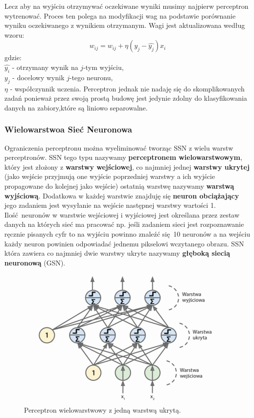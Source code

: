 \documentclass{article}
\begin{document}
Lecz aby na wyjściu otrzymywać oczekiwane wyniki musimy najpierw perceptron wytrenować. Proces
ten polega na modyfikacji wag na podstawie porównanie wyniku oczekiwanego z wynikiem otrzymanym.
Wagi jest aktualizowana według wzoru:
\begin{equation}
	w_{ij} = w_{ij} + \eta(y_j - \hat{y_j})x_i
\end{equation}
gdzie:\\
$\hat{y_i}$ - otrzymany wynik na $j$-tym wyjściu,\\
$y_j$ - docelowy wynik $j$-tego neuronu,\\
$\eta$ - współczynnik uczenia.
Perceptron jednak nie nadaję się do skomplikowanych zadań ponieważ przez swoją prostą budowę
jest jedynie zdolny do klasyfikowania danych na zabiory,które są liniowo separowalne.

\subsubsection{Wielowarstwoa Sieć Neuronowa}
Ograniczenia perceptronu można wyeliminować tworząc SSN z wielu warstw perceptronów.
SSN tego typu nazywamy \textbf{perceptronem wielowarstwowym}, który jest złożony z 
\textbf{warstwy wejściowej}, co najmniej jednej \textbf{warstwy ukrytej} (jako wejście przyjmują
one wyjście poprzedniej warstwy a ich wyjście propagowane do kolejnej jako wejście) ostatnią
warstwę nazywamy \textbf{warstwą wyjściową}. Dodatkowa w każdej warstwie znajduję się 
\textbf{neuron obciążający} jego zadaniem jest wysyłanie na wejście następnej warstwy 
wartości 1. Ilość neuronów w warstwie wejściowej i wyjściowej jest określana przez
zestaw danych na których sieć ma pracować np. jeśli zadaniem sieci jest rozpoznawanie
ręcznie pisanych cyfr to na wyjściu powinno znaleźć się 10 neuronów a na wejściu każdy neuron
powinien odpowiadać jednemu pikselowi wczytanego obrazu.
SSN która zawiera co najmniej dwie warstwy ukryte nazywamy
\textbf{głęboką siecią neuronową} (GSN).

\begin{figure}[H]
\centering
\includegraphics[scale=0.5]{gsn.png}
\caption{Perceptron wielowarstwowy z jedną warstwą ukrytą.}
\end{figure}
\end{document}
